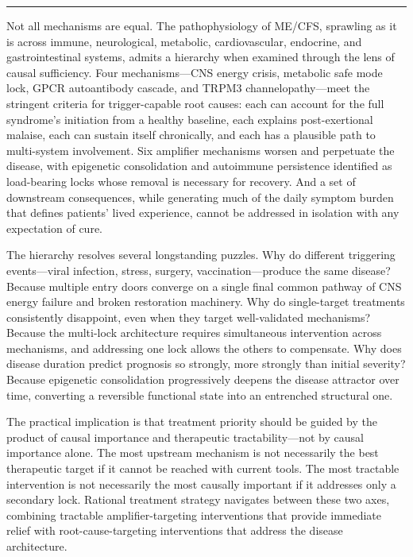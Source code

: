 
\bigskip
\noindent\rule{\textwidth}{0.4pt}
\bigskip

Not all mechanisms are equal. The pathophysiology of ME/CFS, sprawling as it is across immune, neurological, metabolic, cardiovascular, endocrine, and gastrointestinal systems, admits a hierarchy when examined through the lens of causal sufficiency. Four mechanisms---CNS energy crisis, metabolic safe mode lock, GPCR autoantibody cascade, and TRPM3 channelopathy---meet the stringent criteria for trigger-capable root causes: each can account for the full syndrome's initiation from a healthy baseline, each explains post-exertional malaise, each can sustain itself chronically, and each has a plausible path to multi-system involvement. Six amplifier mechanisms worsen and perpetuate the disease, with epigenetic consolidation and autoimmune persistence identified as load-bearing locks whose removal is necessary for recovery. And a set of downstream consequences, while generating much of the daily symptom burden that defines patients' lived experience, cannot be addressed in isolation with any expectation of cure.

The hierarchy resolves several longstanding puzzles. Why do different triggering events---viral infection, stress, surgery, vaccination---produce the same disease? Because multiple entry doors converge on a single final common pathway of CNS energy failure and broken restoration machinery. Why do single-target treatments consistently disappoint, even when they target well-validated mechanisms? Because the multi-lock architecture requires simultaneous intervention across mechanisms, and addressing one lock allows the others to compensate. Why does disease duration predict prognosis so strongly, more strongly than initial severity? Because epigenetic consolidation progressively deepens the disease attractor over time, converting a reversible functional state into an entrenched structural one.

The practical implication is that treatment priority should be guided by the product of causal importance and therapeutic tractability---not by causal importance alone. The most upstream mechanism is not necessarily the best therapeutic target if it cannot be reached with current tools. The most tractable intervention is not necessarily the most causally important if it addresses only a secondary lock. Rational treatment strategy navigates between these two axes, combining tractable amplifier-targeting interventions that provide immediate relief with root-cause-targeting interventions that address the disease architecture.


